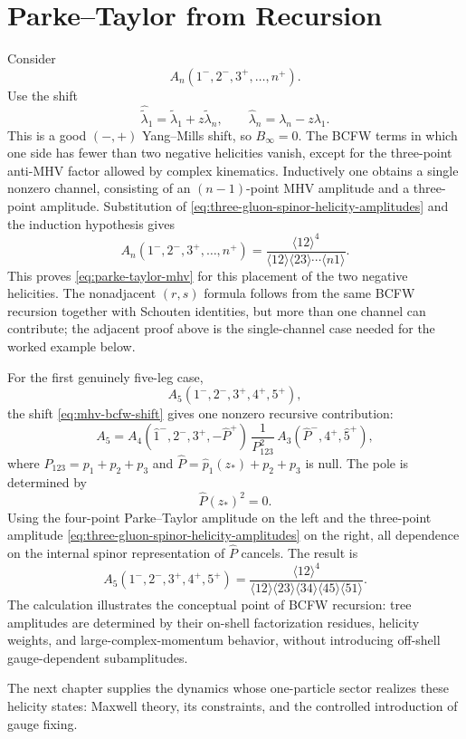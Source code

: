 \section{Parke--Taylor from Recursion}
\label{sec:parke-taylor-from-bcfw}

Consider
\[
  A_n(1^-,2^-,3^+,\ldots,n^+).
\]
Use the shift
\begin{equation}
  \widehat{\widetilde\lambda}_1
  =
  \widetilde\lambda_1+z\widetilde\lambda_n,
  \qquad
  \widehat\lambda_n
  =
  \lambda_n-z\lambda_1 .
  \label{eq:mhv-bcfw-shift}
\end{equation}
This is a good \((-,+)\) Yang--Mills shift, so \(B_\infty=0\).  The BCFW
terms in which one side has fewer than two negative helicities vanish, except
for the three-point anti-MHV factor allowed by complex kinematics.  Inductively
one obtains a single nonzero channel, consisting of an \((n-1)\)-point MHV
amplitude and a three-point amplitude.  Substitution of
\eqref{eq:three-gluon-spinor-helicity-amplitudes} and the induction hypothesis
gives
\[
  A_n(1^-,2^-,3^+,\ldots,n^+)
  =
  \frac{\langle12\rangle^4}
  {\langle12\rangle\langle23\rangle\cdots\langle n1\rangle}.
\]
This proves \eqref{eq:parke-taylor-mhv} for this placement of the two negative
helicities.  The nonadjacent \((r,s)\) formula follows from the same BCFW
recursion together with Schouten identities, but more than one channel can
contribute; the adjacent proof above is the single-channel case needed for the
worked example below.

For the first genuinely five-leg case,
\[
  A_5(1^-,2^-,3^+,4^+,5^+),
\]
the shift \eqref{eq:mhv-bcfw-shift} gives one nonzero recursive contribution:
\begin{equation}
  A_5
  =
  A_4(\widehat{1}^-,2^-,3^+,-\widehat P^+)\,
  \frac{1}{P_{123}^2}\,
  A_3(\widehat P^-,4^+,\widehat{5}^+),
  \label{eq:five-point-mhv-bcfw-channel}
\end{equation}
where \(P_{123}=p_1+p_2+p_3\) and
\(\widehat P=\widehat p_1(z_*)+p_2+p_3\) is null.  The pole is determined by
\[
  \widehat P(z_*)^2=0.
\]
Using the four-point Parke--Taylor amplitude on the left and the
three-point amplitude \eqref{eq:three-gluon-spinor-helicity-amplitudes} on the
right, all dependence on the internal spinor representation of
\(\widehat P\) cancels.  The result is
\begin{equation}
  A_5(1^-,2^-,3^+,4^+,5^+)
  =
  \frac{\langle12\rangle^4}
  {\langle12\rangle\langle23\rangle\langle34\rangle
   \langle45\rangle\langle51\rangle}.
  \label{eq:five-point-parke-taylor}
\end{equation}
The calculation illustrates the conceptual point of BCFW recursion: tree
amplitudes are determined by their on-shell factorization residues, helicity
weights, and large-complex-momentum behavior, without introducing off-shell
gauge-dependent subamplitudes.

The next chapter supplies the dynamics whose one-particle sector realizes
these helicity states: Maxwell theory, its constraints, and the controlled
introduction of gauge fixing.
